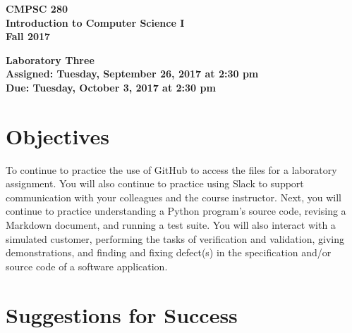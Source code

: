 \documentclass[11pt]{article}
\newcommand{\assignmentduedate}{October 3}
\newcommand{\assignmentassignedate}{September 26}
\newcommand{\assignmentnumber}{Three}
\newcommand{\labyear}{2017}
\newcommand{\labday}{Tuesday}
\newcommand{\labtime}{2:30 pm}
\newcommand{\assigneddate}{Assigned: \labday, \assignmentassignedate, \labyear{} at \labtime{}}
\newcommand{\duedate}{Due: \labday, \assignmentduedate, \labyear{} at \labtime{}}
\newcommand{\labtitle}[1]
{
  \begin{center}
    \begin{center}
      \bf
      CMPSC 280\\Introduction to Computer Science I\\
      Fall 2017\\
      \medskip
    \end{center}
    \bf
    #1
  \end{center}
}
\begin{document}
\thispagestyle{empty}

\labtitle{Laboratory \assignmentnumber{} \\ \assigneddate{} \\ \duedate{}}

\section*{Objectives}

To continue to practice the use of GitHub to access the files for a laboratory assignment. You will also continue to
practice using Slack to support communication with your colleagues and the course instructor. Next, you will continue to
practice understanding a Python program's source code, revising a Markdown document, and running a test suite. You will
also interact with a simulated customer, performing the tasks of verification and validation, giving demonstrations, and
finding and fixing defect(s) in the specification and/or source code of a software application.

\section*{Suggestions for Success}
\end{document}
